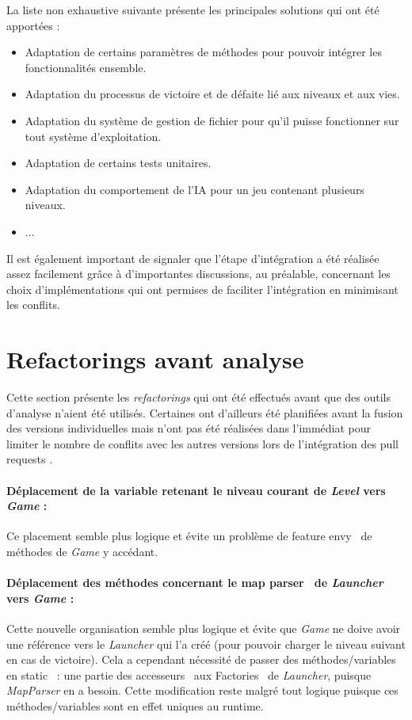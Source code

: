\documentclass[12pt, openany]{report}
\begin{document}
La liste non exhaustive suivante présente les principales solutions qui ont été apportées :\\
\begin{itemize}
\item Adaptation de certains paramètres de méthodes pour pouvoir intégrer les fonctionnalités ensemble.
\item Adaptation du processus de victoire et de défaite lié aux niveaux et aux vies.
\item Adaptation du système de gestion de fichier pour qu'il puisse fonctionner sur tout système d'exploitation.
\item Adaptation de certains tests unitaires.
\item Adaptation du comportement de l'IA pour un jeu contenant plusieurs niveaux.
\item ...
\end{itemize}

Il est également important de signaler que l'étape d'intégration a été réalisée assez facilement grâce à d'importantes discussions, au préalable, concernant les choix d'implémentations qui ont permises de faciliter l'intégration en minimisant les conflits.


\section{Refactorings avant analyse}\label{refactorings}
Cette section présente les \textit{refactorings} qui ont été effectués avant que des outils d'analyse n'aient été utilisés. Certaines ont d'ailleurs été
planifiées avant la fusion des versions individuelles mais n'ont pas été réalisées dans l'immédiat pour limiter le nombre de conflits avec les autres versions lors de l'intégration des \og pull requests \fg .

\paragraph{Déplacement de la variable retenant le niveau courant de \textit{Level} vers \textit{Game} : }
Ce placement semble plus logique et évite un problème de \og feature envy \fg \, de méthodes de \mbox{\textit{Game}} y accédant.
\paragraph{Déplacement des méthodes concernant le \og map parser \fg \, de \textit{Launcher} vers \textit{Game} : }
Cette nouvelle organisation semble plus logique et évite que \mbox{\textit{Game}} ne doive avoir une référence vers le \mbox{\textit{Launcher}} qui l’a créé (pour pouvoir charger le niveau suivant en cas de victoire).
Cela a cependant nécessité de passer des méthodes/variables en \og static \fg \, : une partie des \og accesseurs \fg \, aux \og Factories \fg \, de \mbox{\textit{Launcher}}, puisque \mbox{\textit{MapParser}} en a besoin. Cette modification reste malgré tout logique puisque ces méthodes/variables sont en effet uniques au runtime.
\end{document}
